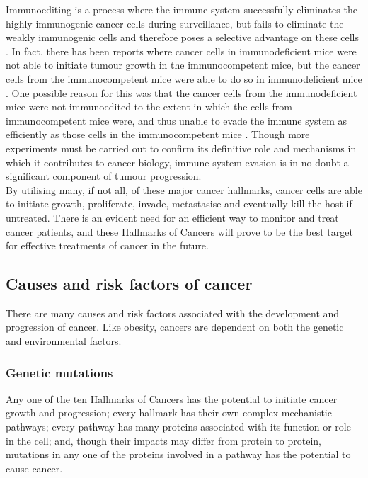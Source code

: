 Immunoediting is a process where the immune system successfully eliminates the highly immunogenic cancer cells during surveillance, but fails to eliminate the weakly immunogenic cells and therefore poses a selective advantage on these cells \citep{Hanahan2011,Teng2008}.
In fact, there has been reports where cancer cells in immunodeficient mice were not able to initiate tumour growth in the immunocompetent mice, but the cancer cells from the immunocompetent mice were able to do so in immunodeficient mice \citep{Hanahan2011}.
One possible reason for this was that the cancer cells from the immunodeficient mice were not immunoedited to the extent in which the cells from immunocompetent mice were, and thus unable to evade the immune system as efficiently as those cells in the immunocompetent mice \citep{Hanahan2011}.
Though more experiments must be carried out to confirm its definitive role and mechanisms in which it contributes to cancer biology, immune system evasion is in no doubt a significant component of tumour progression. \\

\noindent
By utilising many, if not all, of these major cancer hallmarks, cancer cells are able to initiate growth, proliferate, invade, metastasise and eventually kill the host if untreated.
There is an evident need for an efficient way to monitor and treat cancer patients, and these Hallmarks of Cancers will prove to be the best target for effective treatments of cancer in the future.

\subsection{Causes and risk factors of cancer}
\label{sub:causes_and_risk_factors_of_cancer}

There are many causes and risk factors associated with the development and progression of cancer.
Like obesity, cancers are dependent on both the genetic and environmental factors.

\subsubsection{Genetic mutations}
\label{ssub:Genetic mutations}

Any one of the ten Hallmarks of Cancers has the potential to initiate cancer growth and progression; every hallmark has their own complex mechanistic pathways; every pathway has many proteins associated with its function or role in the cell; and, though their impacts may differ from protein to protein, mutations in any one of the proteins involved in a pathway has the potential to cause cancer.

